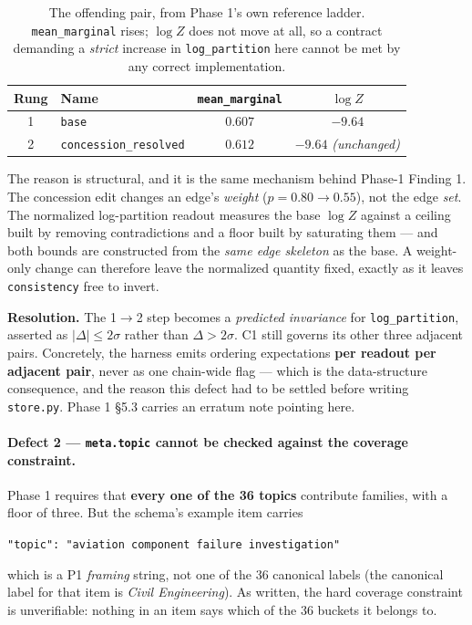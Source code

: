 \documentclass[11pt]{article}
\newcommand{\readout}[1]{\texttt{#1}}
\newcommand{\pymod}[1]{\texttt{#1}}
\begin{document}
\begin{table}[h]\centering\small
\renewcommand{\arraystretch}{1.1}
\begin{tabular}{@{}clcc@{}}
\toprule
\textbf{Rung} & \textbf{Name} & \textbf{\readout{mean\_marginal}} & \textbf{$\log Z$}\\
\midrule
1 & \texttt{base}                 & $0.607$ & $-9.64$\\
\rowcolor{cFix}
2 & \texttt{concession\_resolved} & $0.612$ & $-9.64$ \quad\emph{(unchanged)}\\
\bottomrule
\end{tabular}
\caption{The offending pair, from Phase 1's own reference ladder. \readout{mean\_marginal} rises;
$\log Z$ does not move at all, so a contract demanding a \emph{strict} increase in
\readout{log\_partition} here cannot be met by any correct implementation.}
\label{tab:defect1}
\end{table}

The reason is structural, and it is the same mechanism behind Phase-1 Finding 1. The concession
edit changes an edge's \emph{weight} ($p{=}0.80 \to 0.55$), not the edge \emph{set}. The
normalized log-partition readout measures the base $\log Z$ against a ceiling built by removing
contradictions and a floor built by saturating them --- and both bounds are constructed from the
\emph{same edge skeleton} as the base. A weight-only change can therefore leave the normalized
quantity fixed, exactly as it leaves \readout{consistency} free to invert.

\noindent\textbf{Resolution.} The 1$\to$2 step becomes a \emph{predicted invariance} for
\readout{log\_partition}, asserted as $|\Delta| \leq 2\sigma$ rather than $\Delta > 2\sigma$. C1
still governs its other three adjacent pairs. Concretely, the harness emits ordering expectations
\textbf{per readout per adjacent pair}, never as one chain-wide flag --- which is the data-structure
consequence, and the reason this defect had to be settled before writing \pymod{store.py}. Phase 1
§5.3 carries an erratum note pointing here.

\paragraph{Defect 2 --- \texttt{meta.topic} cannot be checked against the coverage constraint.}
Phase 1 requires that \textbf{every one of the 36 topics} contribute families, with a floor of
three. But the schema's example item carries
\begin{center}
\texttt{"topic": "aviation component failure investigation"}
\end{center}
which is a P1 \emph{framing} string, not one of the 36 canonical labels (the canonical label for
that item is \emph{Civil Engineering}). As written, the hard coverage constraint is unverifiable:
nothing in an item says which of the 36 buckets it belongs to.
\end{document}

